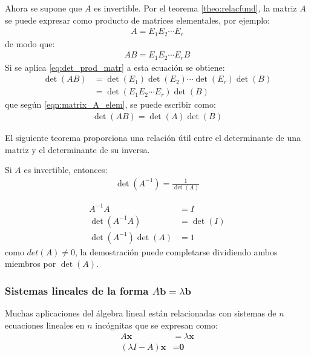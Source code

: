 \documentclass[a4paper,12pt]{article}
\begin{document}
 Ahora se supone que $A$ es invertible. Por el teorema
\ref{theo:relacfund}, la matriz $A$ se puede expresar como producto de
matrices elementales, por ejemplo:
\begin{align}
  A=E_1E_2\cdots E_r
  \label{eqn:matrix_A_elem}
\end{align}
de modo que:
\begin{align*}
  AB=E_1E_2\cdots E_rB
\end{align*}
Si se aplica \eqref{eq:det_prod_matr} a esta ecuación se obtiene:
\begin{align*}
  \det(AB)&=\det(E_1)\det(E_2)\cdots \det(E_r)\det(B) \\
          &=\det(E_1E_2\cdots E_r)\det(B)
\end{align*}
que según \eqref{eqn:matrix_A_elem}, se puede escribir como:
\begin{align*}
  \det(AB)=\det(A)\det(B)
\end{align*}

El siguiente teorema proporciona una relación útil entre el determinante de
una matriz y el determinante de su inversa.

\begin{theorem}
  Si $A$ es invertible, entonces:
  \begin{align*}
    \det\left( A^{-1} \right)=\frac{1}{\det(A)}
  \end{align*}
  \label{theo:det_inv_matriz}
\end{theorem}

\demo 
\begin{align*}
  A^{-1}A&=I \\
  \det\left( A^{-1}A \right)&=\det(I) \\
  \det\left( A^{-1} \right)\det(A)&=1
\end{align*}
como $det(A)\ne0$, la demostración puede completarse dividiendo ambos miembros
por $\det(A)$.

\subsubsection{Sistemas lineales de la forma
$A\mathbf{b}=\lambda\mathbf{b}$}

Muchas aplicaciones del álgebra lineal están relacionadas con sistemas de
$n$ ecuaciones lineales en $n$ incógnitas que se expresan como:
\begin{align}
  A\mathbf{x}&=\lambda\mathbf{x} \\
  (\lambda I-A)\mathbf{x}&=\textbf{0} \label{eqn:sist_ec_lineales}
\end{align}
\end{document}
